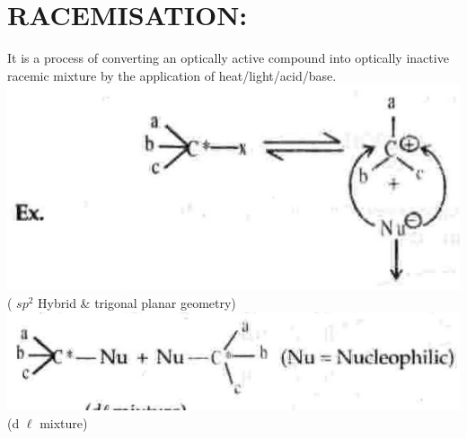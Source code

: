 \documentclass[10pt]{article}
\begin{document}
\section*{RACEMISATION:}
It is a process of converting an optically active compound into optically inactive racemic mixture by the application of heat/light/acid/base.\\
\includegraphics[max width=\textwidth, center]{2025_01_28_8470952b98110cec3aabg-058(2)}\\
( $s p^{2}$ Hybrid \& trigonal planar geometry)\\
\includegraphics[max width=\textwidth, center]{2025_01_28_8470952b98110cec3aabg-058(1)}\\
(d $\ell$ mixture)
\end{document}
